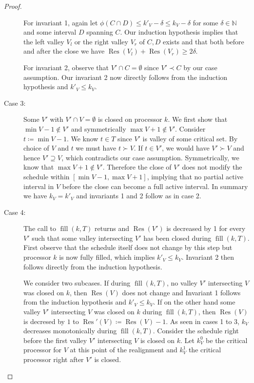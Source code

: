 \documentclass[a4paper]{article}
\DeclareMathOperator{\fillop}{fill}
\DeclareMathOperator{\res}{Res}
\begin{document}
\begin{proof}
\begin{description}
      For invariant 1, again let $\phi(C \cap D) \leq k'_V - \delta \leq k_V - \delta$ for some $\delta \in \mathbb{N}$ and some interval $D$ spanning $C$.
      Our induction hypothesis implies that the left valley $V_l$ or the right valley $V_r$ of $C, D$ exists and that both before and after the close we have $\res(V_l) + \res(V_r) \geq 2 \delta$.

      For invariant 2, observe that $V' \cap C = \emptyset$ since $V' \prec C$ by our case assumption.
      Our invariant 2 now directly follows from the induction hypothesis and $k'_V \leq k_V$.

    \item[Case 3:]
      Some $V'$ with $V' \cap V = \emptyset$ is closed on processor $k$.
      We first show that $\min V - 1 \notin V'$ and symmetrically $\max V + 1 \notin V'$.
      Consider $t \coloneqq \min V - 1$.
      We know $t \in T$ since $V'$ is valley of some critical set.
      By choice of $V$ and $t$ we must have $t \succ V$.
      If $t \in V'$, we would have $V' \succ V$ and hence $V' \supseteq V$, which contradicts our case assumption.
      Symmetrically, we know that $\max V + 1 \notin V'$.
      Therefore the close of $V'$ does not modify the schedule within $[\min V - 1, \max V + 1]$, implying that no partial active interval in $V$ before the close can become a full active interval.
      In summary we have $k_V = k'_V$ and invariants 1 and 2 follow as in case 2.

    \item[Case 4:]
      The call to $\fillop(k, T)$ returns and $\res(V')$ is decreased by 1 for every $V'$ such that some valley intersecting $V'$ has been closed during $\fillop(k, T)$.
      First observe that the schedule itself does not change by this step but processor $k$ is now fully filled, which implies $k'_V \leq k_V$.
      Invariant 2 then follows directly from the induction hypothesis.

      We consider two subcases.
      If during $\fillop(k, T)$, no valley $V'$ intersecting $V$ was closed on $k$, then $\res(V)$ does not change and Invariant 1 follows from the induction hypothesis and $k'_V \leq k_V$.
      If on the other hand some valley $V'$ intersecting $V$ was closed on $k$ during $\fillop(k, T)$, then $\res(V)$ is decresed by $1$ to $\res'(V) \coloneqq \res(V) - 1$.
      As seen in cases 1 to 3, $k_V$ decreases monotonically during $\fillop(k, T)$.
      Consider the schedule right before the first valley $V'$ intersecting $V$ is closed on $k$.
      Let $k^0_V$ be the critical processor for $V$ at this point of the realignment and $k^1_V$ the critical processor right after $V'$ is closed.


\end{description}
\end{proof}
\end{document}
